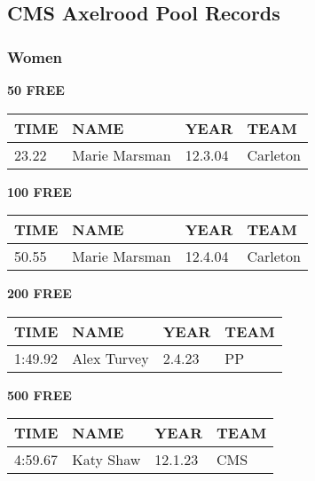 
\newpage

\subsection{CMS Axelrood Pool Records}
\subsubsection{Women}

\begin{table}[H]
\centering
\begin{minipage}[t]{0.48\textwidth}
\centering
\textbf{50 FREE}\\[0.1cm]
\begin{tabular}{@{}p{1.8cm}p{2.8cm}p{1.2cm}p{1.4cm}@{}}
\hline
    \textbf{TIME} & \textbf{NAME} & \textbf{YEAR} & \textbf{TEAM} \\
\hline
    23.22 & Marie Marsman & 12.3.04 & Carleton \\
\hline
\end{tabular}
\end{minipage}\hfill
\begin{minipage}[t]{0.48\textwidth}
\centering
\textbf{100 FREE}\\[0.1cm]
\begin{tabular}{@{}p{1.8cm}p{2.8cm}p{1.2cm}p{1.4cm}@{}}
\hline
    \textbf{TIME} & \textbf{NAME} & \textbf{YEAR} & \textbf{TEAM} \\
\hline
    50.55 & Marie Marsman & 12.4.04 & Carleton \\
\hline
\end{tabular}
\end{minipage}
\end{table}

\begin{table}[H]
\centering
\begin{minipage}[t]{0.48\textwidth}
\centering
\textbf{200 FREE}\\[0.1cm]
\begin{tabular}{@{}p{1.8cm}p{2.8cm}p{1.2cm}p{1.4cm}@{}}
\hline
    \textbf{TIME} & \textbf{NAME} & \textbf{YEAR} & \textbf{TEAM} \\
\hline
    1:49.92 & Alex Turvey & 2.4.23 & PP \\
\hline
\end{tabular}
\end{minipage}\hfill
\begin{minipage}[t]{0.48\textwidth}
\centering
\textbf{500 FREE}\\[0.1cm]
\begin{tabular}{@{}p{1.8cm}p{2.8cm}p{1.2cm}p{1.4cm}@{}}
\hline
    \textbf{TIME} & \textbf{NAME} & \textbf{YEAR} & \textbf{TEAM} \\
\hline
    4:59.67 & Katy Shaw & 12.1.23 & CMS \\
\hline
\end{tabular}
\end{minipage}
\end{table}

